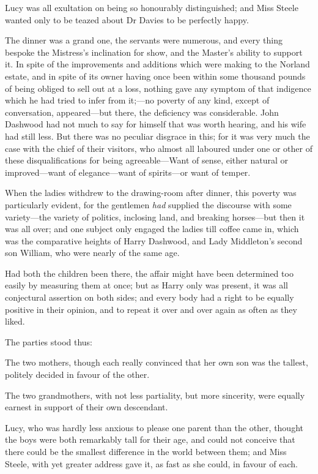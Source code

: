 Lucy was all exultation on being so honourably distinguished; and Miss Steele wanted only to be teazed about Dr Davies to be perfectly happy.

The dinner was a grand one, the servants were numerous, and every thing bespoke the Mistress’s inclination for show, and the Master’s ability to support it. In spite of the improvements and additions which were making to the Norland estate, and in spite of its owner having once been within some thousand pounds of being obliged to sell out at a loss, nothing gave any symptom of that indigence which he had tried to infer from it;—no poverty of any kind, except of conversation, appeared—but there, the deficiency was considerable. John Dashwood had not much to say for himself that was worth hearing, and his wife had still less. But there was no peculiar disgrace in this; for it was very much the case with the chief of their visitors, who almost all laboured under one or other of these disqualifications for being agreeable—Want of sense, either natural or improved—want of elegance—want of spirits—or want of temper.

When the ladies withdrew to the drawing-room after dinner, this poverty was particularly evident, for the gentlemen \textit{had} supplied the discourse with some variety—the variety of politics, inclosing land, and breaking horses—but then it was all over; and one subject only engaged the ladies till coffee came in, which was the comparative heights of Harry Dashwood, and Lady Middleton’s second son William, who were nearly of the same age.

Had both the children been there, the affair might have been determined too easily by measuring them at once; but as Harry only was present, it was all conjectural assertion on both sides; and every body had a right to be equally positive in their opinion, and to repeat it over and over again as often as they liked.

The parties stood thus:

The two mothers, though each really convinced that her own son was the tallest, politely decided in favour of the other.

The two grandmothers, with not less partiality, but more sincerity, were equally earnest in support of their own descendant.

Lucy, who was hardly less anxious to please one parent than the other, thought the boys were both remarkably tall for their age, and could not conceive that there could be the smallest difference in the world between them; and Miss Steele, with yet greater address gave it, as fast as she could, in favour of each.

